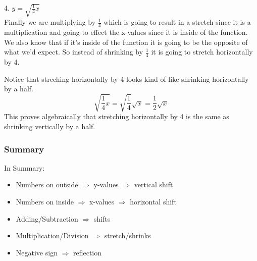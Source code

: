 4. $y=\sqrt{\frac{1}{4}x}$ \\
Finally we are multiplying by $\frac{1}{4}$ which is going to result in a stretch since it is a multiplication and going to effect the x-values since it is inside of the function. We also know that if it's inside of the function it is going to be the opposite of what we'd expect. So instead of shrinking by $\frac{1}{4}$ it is going to stretch horizontally by 4. \\

Notice that streching horizontally by 4 looks kind of like shrinking horizontally by a half. 
$$ \sqrt{\frac{1}{4}x} = \sqrt{\frac{1}{4}}\sqrt{x} = \frac{1}{2}\sqrt{x}$$
This proves algebraically that stretching horizontally by 4 is the same as shrinking vertically by a half. \\

\subsubsection*{Summary}
In Summary: \\
\begin{itemize}
	\item Numbers on outside $\Rightarrow$ y-values $\Rightarrow$ vertical shift
	\item Numbers on inside $\Rightarrow$ x-values $\Rightarrow$ horizontal shift
	\item  Adding/Subtraction $\Rightarrow$ shifts
	\item  Multiplication/Division $\Rightarrow$ stretch/shrinks
	\item Negative sign $\Rightarrow$ reflection
\end{itemize} 